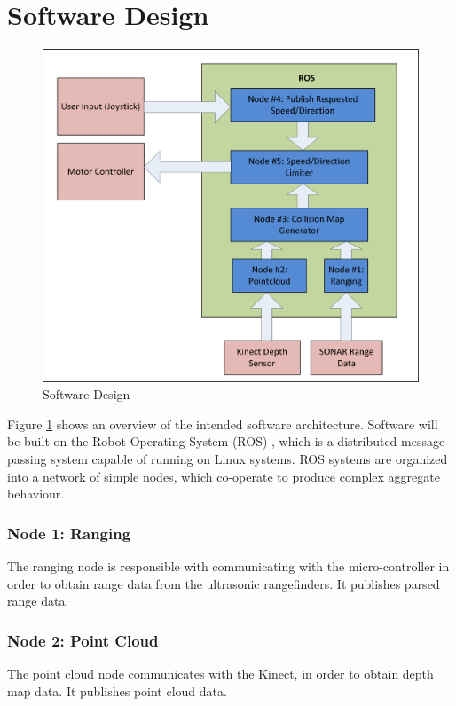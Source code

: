 \documentclass[oneside,final,a4paper]{report}
\begin{document}
\section{Software Design}
\begin{figure}[hbt]
 \centering
 \includegraphics[scale=0.9]{Software_Diagram}
 \caption{Software Design}\label{fig:software}
\end{figure}

Figure \ref{fig:software} shows an overview of the intended software architecture.  Software will be built on the Robot Operating System (ROS) \cite{ROS}, which is a distributed message passing system capable of running on Linux systems.  ROS systems are organized into a network of simple nodes, which co-operate to produce complex aggregate behaviour. 

\subsubsection{Node 1: Ranging}
The ranging node is responsible with communicating with the micro-controller in order to obtain range data from the ultrasonic rangefinders.  It publishes parsed range data.

\subsubsection{Node 2: Point Cloud}
The point cloud node communicates with the Kinect, in order to obtain depth map data.  It publishes point cloud data.
\end{document}
